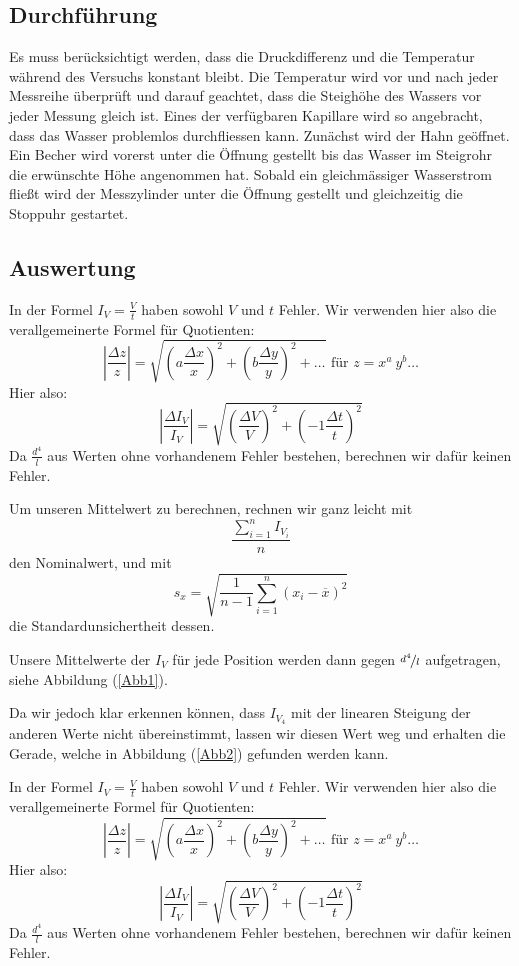 \documentclass[11pt,a4paper]{article}
\begin{document}
\pagebreak

\subsection{Durchführung}

Es muss berücksichtigt werden, dass die Druckdifferenz und die Temperatur während des Versuchs konstant bleibt. Die Temperatur wird vor und nach jeder Messreihe überprüft und darauf geachtet, dass die Steighöhe des Wassers vor jeder Messung gleich ist. Eines der verfügbaren Kapillare wird so angebracht, dass das Wasser problemlos durchfliessen kann. Zunächst wird der Hahn geöffnet. Ein Becher wird vorerst unter die Öffnung gestellt bis das Wasser im Steigrohr die erwünschte Höhe angenommen hat. Sobald ein gleichmässiger Wasserstrom fließt wird der Messzylinder unter die Öffnung gestellt und gleichzeitig die Stoppuhr gestartet. 

\subsection{Auswertung}

In der Formel $I_V=\frac{V}{t}$ haben sowohl $V$ und $t$ Fehler. Wir verwenden hier also die verallgemeinerte Formel f\"ur Quotienten:
$$
\left\vert\frac{\Delta z}{z}\right\vert=\sqrt{\left(a\frac{\Delta x}{x}\right)^2+\left(b\frac{\Delta y}{y}\right)^2+\ldots}\textrm{ f\"ur }z=x^a\ y^b\ldots
$$
Hier also:
$$
\left\vert\frac{\Delta I_V}{I_V}\right\vert=\sqrt{\left(\frac{\Delta V}{V}\right)^2+\left(-1\frac{\Delta t}{t}\right)^2}
$$
Da $\frac{d^4}{l}$ aus Werten ohne vorhandenem Fehler bestehen, berechnen wir daf\"ur keinen Fehler.

Um unseren Mittelwert zu berechnen, rechnen wir ganz leicht mit 
$$
\frac{\sum_{i=1}^n I_{V_i}}{n}
$$
den Nominalwert, und mit
$$
s_x=\sqrt{\frac{1}{n-1}\sum_{i=1}^n(x_i-\overline{x})^2}
$$
die Standardunsichertheit dessen.

Unsere Mittelwerte der $I_V$ f\"ur jede Position werden dann gegen $\nicefrac{d^4}{l}$ aufgetragen, siehe Abbildung (\ref{Abb1}).

Da wir jedoch klar erkennen k\"onnen, dass $I_{V_4}$ mit der linearen Steigung der anderen Werte nicht \"ubereinstimmt, lassen wir diesen Wert weg und erhalten die Gerade, welche in Abbildung (\ref{Abb2}) gefunden werden kann.

In der Formel $I_V=\frac{V}{t}$ haben sowohl $V$ und $t$ Fehler. Wir verwenden hier also die verallgemeinerte Formel f\"ur Quotienten:
$$
\left\vert\frac{\Delta z}{z}\right\vert=\sqrt{\left(a\frac{\Delta x}{x}\right)^2+\left(b\frac{\Delta y}{y}\right)^2+\ldots}\textrm{ f\"ur }z=x^a\ y^b\ldots
$$
Hier also:
$$
\left\vert\frac{\Delta I_V}{I_V}\right\vert=\sqrt{\left(\frac{\Delta V}{V}\right)^2+\left(-1\frac{\Delta t}{t}\right)^2}
$$
Da $\frac{d^4}{l}$ aus Werten ohne vorhandenem Fehler bestehen, berechnen wir daf\"ur keinen Fehler.
\end{document}
